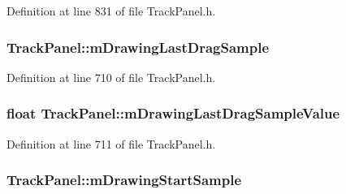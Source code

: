 Definition at line 831 of file Track\+Panel.\+h.

\subsubsection[{\texorpdfstring{m\+Drawing\+Last\+Drag\+Sample}{mDrawingLastDragSample}}]{ Track\+Panel\+::m\+Drawing\+Last\+Drag\+Sample\hspace{0.3cm}{\ttfamily [protected]}}\hypertarget{class_track_panel_ab5839208cbf7b0a2b5c6f174c7ef8971}{}\label{class_track_panel_ab5839208cbf7b0a2b5c6f174c7ef8971}


Definition at line 710 of file Track\+Panel.\+h.

\subsubsection[{\texorpdfstring{m\+Drawing\+Last\+Drag\+Sample\+Value}{mDrawingLastDragSampleValue}}]{\setlength{\rightskip}{0pt plus 5cm}float Track\+Panel\+::m\+Drawing\+Last\+Drag\+Sample\+Value\hspace{0.3cm}{\ttfamily [protected]}}\hypertarget{class_track_panel_aaf6a9b516234e90fd8f9580f412c5013}{}\label{class_track_panel_aaf6a9b516234e90fd8f9580f412c5013}


Definition at line 711 of file Track\+Panel.\+h.

\subsubsection[{\texorpdfstring{m\+Drawing\+Start\+Sample}{mDrawingStartSample}}]{ Track\+Panel\+::m\+Drawing\+Start\+Sample\hspace{0.3cm}{\ttfamily [protected]}}\hypertarget{class_track_panel_afbfde4aa5fba18839a21de39a75856bb}{}\label{class_track_panel_afbfde4aa5fba18839a21de39a75856bb}


